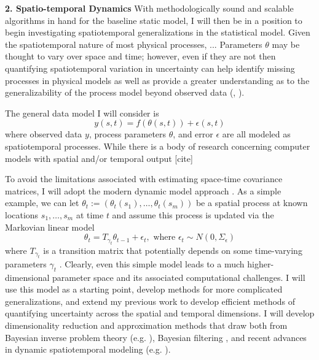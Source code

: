 \documentclass[12pt]{article}
\begin{document}
 \textbf{2. Spatio-temporal Dynamics}
With methodologically sound and scalable algorithms in hand for the baseline static model, I will then be in a position to begin investigating spatiotemporal generalizations in the statistical model. Given the spatiotemporal nature of most physical processes, ... Parameters $\theta$ may be thought to vary over space
and time; however, even if they are not then quantifying spatiotemporal variation in uncertainty can help identify 
missing processes in physical models as well as provide a greater understanding as to the generalizability of the process model beyond observed data (\cite{Fer2}, \cite{Dietze}).

The general data model I will consider is 
  \[y(s, t) = f(\theta(s, t)) + \epsilon(s, t)\]
 where observed data $y$, process parameters $\theta$, and error $\epsilon$ are all modeled as spatiotemporal processes. While there is a body of research
 concerning computer models with spatial and/or temporal output [cite] 
 
 
 
 To avoid the limitations associated with estimating space-time covariance matrices, I will adopt the modern dynamic model approach \cite{Arab}. As a simple example, 
  we can let $\theta_t := (\theta_t (s_1), \dots, \theta_t (s_m))$ be a spatial process at known locations $s_1, \dots, s_m$ at time $t$ and assume this process is updated
  via the Markovian linear model
  \[\theta_t = T_{\gamma_t} \theta_{t - 1} + \epsilon_t, \text{ where } \epsilon_t \sim N(0, \Sigma_\epsilon)\]
  where $T_{\gamma_t}$ is a transition matrix that potentially depends on some time-varying parameters $\gamma_t$ \cite{Arab}. Clearly, even this simple model leads to a 
  much higher-dimensional parameter space and its associated computational challenges. I will use this model as a starting point, develop methods for more
  complicated generalizations, and extend my previous work to develop efficient methods of quantifying uncertainty across the spatial and temporal dimensions. 
  I will develop dimensionality reduction and approximation methods that draw both from Bayesian inverse problem theory (e.g. \cite{Kugler}), Bayesian filtering \cite{Sarkka},
  and recent advances in dynamic spatiotemporal modeling (e.g. \cite{Hefley}). 
 
\end{document}
